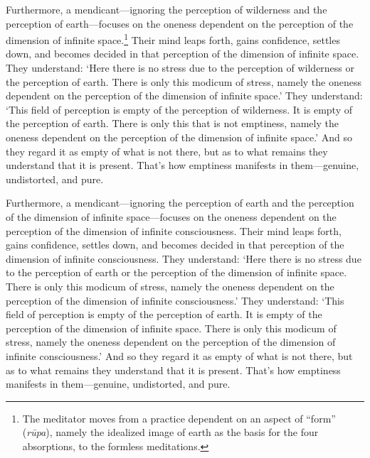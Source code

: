 \documentclass[12pt,openany]{book}%
\begin{document}
Furthermore, a mendicant—ignoring the perception of wilderness and the perception of earth—focuses on the oneness dependent on the perception of the dimension of infinite space.\footnote{The meditator moves from a practice dependent on an aspect of “form” (\textit{\textsanskrit{rūpa}}), namely the idealized image of earth as the basis for the four absorptions, to the formless meditations. } Their mind leaps forth, gains confidence, settles down, and becomes decided in that perception of the dimension of infinite space. They understand: ‘Here there is no stress due to the perception of wilderness or the perception of earth. There is only this modicum of stress, namely the oneness dependent on the perception of the dimension of infinite space.’ They understand: ‘This field of perception is empty of the perception of wilderness. It is empty of the perception of earth. There is only this that is not emptiness, namely the oneness dependent on the perception of the dimension of infinite space.’ And so they regard it as empty of what is not there, but as to what remains they understand that it is present. That’s how emptiness manifests in them—genuine, undistorted, and pure. 

Furthermore, a mendicant—ignoring the perception of earth and the perception of the dimension of infinite space—focuses on the oneness dependent on the perception of the dimension of infinite consciousness. Their mind leaps forth, gains confidence, settles down, and becomes decided in that perception of the dimension of infinite consciousness. They understand: ‘Here there is no stress due to the perception of earth or the perception of the dimension of infinite space. There is only this modicum of stress, namely the oneness dependent on the perception of the dimension of infinite consciousness.’ They understand: ‘This field of perception is empty of the perception of earth. It is empty of the perception of the dimension of infinite space. There is only this modicum of stress, namely the oneness dependent on the perception of the dimension of infinite consciousness.’ And so they regard it as empty of what is not there, but as to what remains they understand that it is present. That’s how emptiness manifests in them—genuine, undistorted, and pure. 
\end{document}
